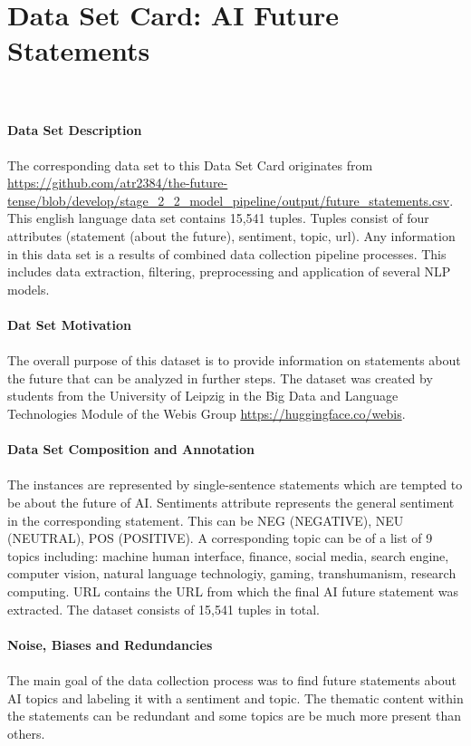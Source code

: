 \section{Data Set Card: AI Future Statements}
\\
\\
\textbf{Data Set Description}
\\
\\
The corresponding data set to this Data Set Card originates from \url{https://github.com/atr2384/the-future-tense/blob/develop/stage_2_2_model_pipeline/output/future_statements.csv}.
This english language data set contains 15,541 tuples.
Tuples consist of four attributes (statement (about the future), sentiment, topic, url).
Any information in this data set is a results of combined data collection pipeline processes.
This includes data extraction, filtering, preprocessing and application of several NLP models.
\\
\\
\textbf{Dat Set Motivation}
\\
\\
The overall purpose of this dataset is to provide information on statements about the future that can be analyzed in further steps.
The dataset was created by students from the University of Leipzig in the Big Data and Language Technologies Module of the Webis Group \url{https://huggingface.co/webis}.
\\
\\
\textbf{Data Set Composition and Annotation}
\\
\\
The instances are represented by single-sentence statements which are tempted to be about the future of AI.
Sentiments attribute represents the general sentiment in the corresponding statement. This can be NEG (NEGATIVE), NEU (NEUTRAL), POS (POSITIVE).
A corresponding topic can be of a list of 9 topics including: machine human interface, finance, social media, search engine, computer vision, natural language technologiy, gaming, transhumanism, research computing.
URL contains the URL from which the final AI future statement was extracted.
The dataset consists of 15,541 tuples in total.
\\
\\
\textbf{Noise, Biases and Redundancies}
\\
\\
The main goal of the data collection process was to find future statements about AI topics and labeling it with a sentiment and topic.
The thematic content within the statements can be redundant and some topics are be much more present than others.

